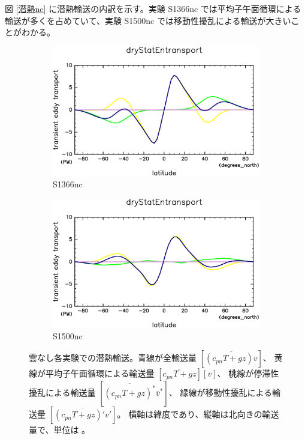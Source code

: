 \documentclass[body]{subfiles}
\begin{document}
図 \ref{潜熱nc} に潜熱輸送の内訳を示す。実験 S1366nc では平均子午面循環による
輸送が多くを占めていて、実験 S1500nc では移動性擾乱による輸送が大きいことがわかる。

\begin{figure}[t]
	\centering
	\begin{subfigure}{.4\textwidth}
		\centering
		\includegraphics[width=\columnwidth]{S1366-nc/MeriHeatTrans@dryStatEn,time=3650:4015-crop-rotate.pdf}
		\caption{S1366nc}\label{乾燥静的エネルギーS1366nc}
	\end{subfigure}
	\begin{subfigure}{.4\textwidth}
		\centering
		\includegraphics[width=\columnwidth]{S1500-nc/MeriHeatTrans@dryStatEn,time=3650:4015-crop-rotate.pdf}
		\caption{S1500nc}\label{乾燥静的エネルギーS1500nc}
	\end{subfigure}
	\caption[雲なし各実験での乾燥静的エネルギー輸送の内訳]{
		雲なし各実験での潜熱輸送。青線が全輸送量 \([\overline{(c_{pn}T+gz)v}]\)、
		黄線が平均子午面循環による輸送量 \([\overline{c_{pn}T+gz}][\overline{v}]\)、
		桃線が停滞性擾乱による輸送量 \([\overline{(c_{pn}T+gz)^*}\bar v^*]\)、
		緑線が移動性擾乱による輸送量 \([\overline{(c_{pn}T+gz)'v'}]\)。
		横軸は緯度であり、縦軸は北向きの輸送量で、単位は 。
	}\label{乾燥静的エネルギーnc}
\end{figure}
\end{document}
